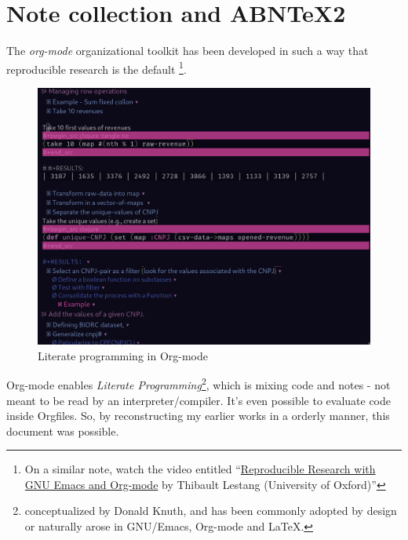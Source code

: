 \documentclass[
12pt,				%
openright,			%
oneside,			%
a4paper,			%
brazil,				%
english,			%
]{abntex2}
\begin{document}
\section{Note collection and ABNTeX2}

The \textit{org-mode} organizational toolkit has been developed in such a way
that reproducible research is the default
\cite{stanisic2015effective}\footnote{On a similar note, watch the
  video entitled
  ``\href{https://www.youtube.com/watch?v=AP4LX8L7MFM}{Reproducible
    Research with GNU Emacs and Org-mode} by Thibault Lestang (University of Oxford)''}.
\begin{figure}[ht]
  \centering
    \caption{\label{fig:literate-programming} Literate programming in Org-mode}
    \includegraphics[width=0.7\linewidth]{Imagens/org-mode.png}
\end{figure}

Org-mode enables \textit{Literate Programming}\footnote{conceptualized
by Donald Knuth\cite{knuth1984literate}, and has been commonly adopted
by design or naturally arose in GNU/Emacs, Org-mode and \LaTeX{}.}, which is mixing code
and notes - not meant to be read by an interpreter/compiler. It's even
possible to evaluate code inside Orgfiles. So, by reconstructing my
earlier works in a orderly manner, this document was possible.
\end{document}
